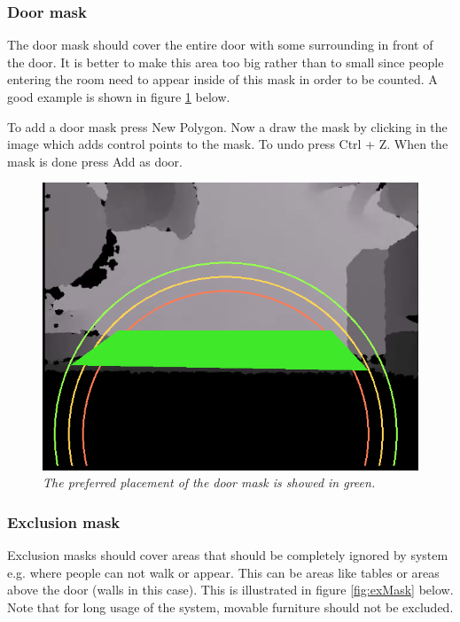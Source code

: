 \newpage
\subsubsection{Door mask}
The door mask should cover the entire door with some surrounding in front of the door. It is better to make this area too big rather than to small since people entering the room need to appear inside of this mask in order to be counted. A good example is shown in figure \ref{fig:doorMask} below. 

To add a door mask press New Polygon. Now a draw the mask by clicking in the image which adds control points to the mask. To undo press Ctrl + Z. When the mask is done press Add as door.

\begin{figure}[H]
	\centering
	\includegraphics[width=\linewidth]{images/Manual3.png}
	\caption[Exclusion mask]{\textit{The preferred placement of the door mask is showed in green.}}
	\label{fig:doorMask}  %
\end{figure}

\newpage
\subsubsection{Exclusion mask}
Exclusion masks should cover areas that should be completely ignored by system e.g. where people can not walk or appear. This can be areas like tables or areas above the door (walls in this case). This is illustrated in figure \ref{fig:exMask} below. Note that for long usage of the system, movable furniture should not be excluded.

